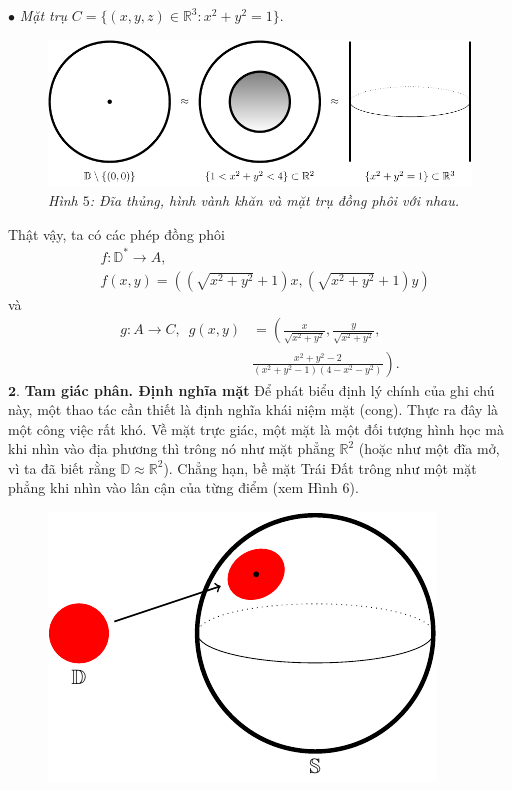 \begin{multicols}{2}
	\vskip 0.1cm
	$\bullet$ {\it Mặt trụ} $C = \{(x,y,z) \in \mathbb{R}^3: x^2 + y^2 = 1\}$. 
	\begin{figure}[H]
		\vspace*{-5pt}
		\centering\captionsetup{labelformat=empty, justification=centering}
		\includegraphics[width=1\linewidth]{H5.pdf}
		\caption{\small\textit{\color{duongvaotoanhoc}Hình $5$: Đĩa thủng, hình vành khăn và mặt trụ đồng phôi với nhau.}}
		\vspace*{-10pt}
	\end{figure}
	Thật vậy, ta có các phép đồng phôi
	\begin{align*}
		&f: \mathbb{D}^\ast \to A,\\
		&f(x,y) \!=\! \left(\!\!\left(\!\!\sqrt{x^2 \!+\! y^2} \!+\! 1\!\!\right)\!x,\left(\!\!\sqrt{x^2 \!+\! y^2} \!+\! 1\!\right)y\!\right)
	\end{align*}
	và
	\begin{align*}
		g\!:\! A \!\to\! C,\,\,\,g(x,y)& = \left(\!\!\frac{x}{\sqrt{x^2 + y^2}},\frac{y}{\sqrt{x^2 + y^2}},\right.\\
		&\left.\frac{x^2\!+\!y^2\!-\!2}{(x^2\!+\!y^2\!-\!1)(4\!-\!x^2\!-\!y^2)}\!\!\right)\!.
	\end{align*}
	$\pmb{2.}$ \textbf{\color{duongvaotoanhoc}Tam giác phân. Định nghĩa mặt}
	\vskip 0.1cm
	Để phát biểu định lý chính của ghi chú này, một thao tác cần thiết là định nghĩa khái niệm mặt (cong). Thực ra đây là một công việc rất khó. Về mặt trực giác, một mặt là một đối tượng hình học mà khi nhìn vào địa phương thì trông nó như mặt phẳng $\mathbb{R}^2$ (hoặc như một đĩa mở, vì ta đã biết rằng $\mathbb{D} \approx \mathbb{R}^2$). Chẳng hạn, bề mặt Trái Đất trông như một mặt phẳng khi nhìn vào lân cận của từng điểm (xem Hình $6$).
	\begin{figure}[H]
		\vspace*{-5pt}
		\centering\captionsetup{labelformat=empty, justification=centering}
		\includegraphics[width=0.7\linewidth]{H6.pdf}

\end{figure}
\end{multicols}
